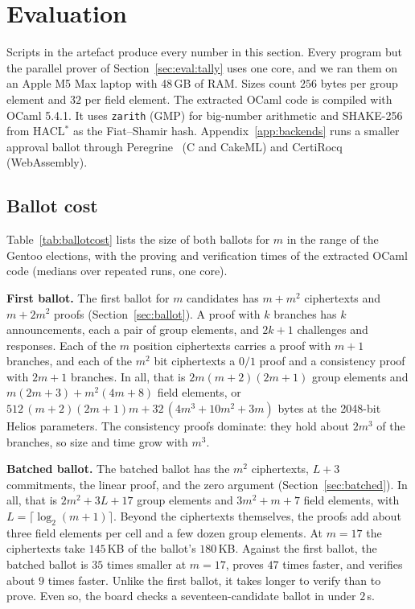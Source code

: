 \section{Evaluation}\label{sec:eval}
Scripts in the artefact produce every number in this section. Every
program but the parallel prover of Section~\ref{sec:eval:tally} uses
one core, and we ran them on an Apple M5 Max laptop with 48\,GB of RAM. Sizes count $256$ bytes per group element and $32$
per field element. The extracted OCaml code is compiled with OCaml 5.4.1. It
uses \texttt{zarith} (GMP) for big-number arithmetic and SHAKE-256 from
HACL$^*$ as the Fiat--Shamir hash. Appendix~\ref{app:backends} runs a
smaller approval ballot through Peregrine~\cite{peregrine} (C and CakeML) and CertiRocq
(WebAssembly).


\subsection{Ballot cost}\label{sec:eval:ballot}
Table~\ref{tab:ballotcost} lists the size of both ballots for $m$ in
the range of the Gentoo elections, with the proving and verification
times of the extracted OCaml code (medians over repeated runs, one core).

\textbf{First ballot.} The first ballot for $m$ candidates has $m + m^2$
ciphertexts and $m + 2m^2$ proofs (Section~\ref{sec:ballot}). A proof
with $k$ branches has $k$ announcements, each a pair of group elements,
and $2k+1$ challenges and responses. Each of the $m$ position ciphertexts
carries a proof with $m+1$ branches, and each of the $m^2$ bit
ciphertexts a $0/1$ proof and a consistency proof with $2m+1$ branches.
In all, that is $2m(m+2)(2m+1)$ group elements and $m(2m+3) +
m^2(4m+8)$ field elements, or $512\,(m+2)(2m+1)m + 32\,(4m^3 + 10m^2 +
3m)$ bytes at the 2048-bit Helios parameters. The consistency proofs
dominate: they hold about $2m^3$ of the branches, so size and time grow
with $m^3$. 

\textbf{Batched ballot.} The batched ballot has the $m^2$ ciphertexts,
$L + 3$ commitments, the linear proof, and the zero argument
(Section~\ref{sec:batched}). In all, that is $2m^2 + 3L + 17$ group
elements and $3m^2 + m + 7$ field elements, with $L = \lceil \log_2
(m+1) \rceil$. Beyond the ciphertexts themselves, the proofs add about
three field elements per cell and a few dozen group elements. At $m =
17$ the ciphertexts take $145$\,KB of the ballot's $180$\,KB. Against
the first ballot, the batched ballot is $35$ times smaller at $m = 17$,
proves $47$ times faster, and verifies about $9$ times faster. Unlike
the first ballot, it takes longer to verify than to prove. Even so, the
board checks a seventeen-candidate ballot in under $2$\,s.

